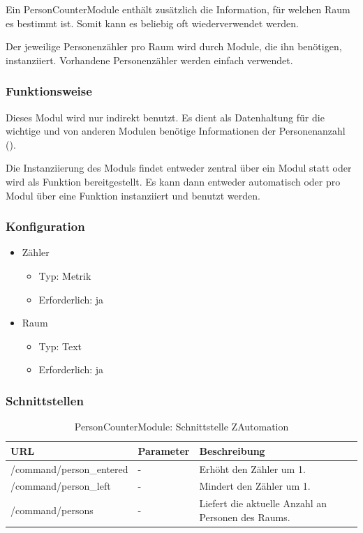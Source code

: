 Ein PersonCounterModule enthält zusätzlich die Information, für welchen Raum es bestimmt ist. Somit kann es beliebig oft wiederverwendet werden.

Der jeweilige Personenzähler pro Raum wird durch Module, die ihn benötigen, instanziiert. Vorhandene Personenzähler werden einfach verwendet.

\subsubsection{Funktionsweise}
Dieses Modul wird nur indirekt benutzt. Es dient als Datenhaltung für die wichtige und von anderen Modulen benötige Informationen der Personenanzahl ().

Die Instanziierung des Moduls findet entweder zentral über ein Modul statt oder wird als Funktion bereitgestellt. Es kann dann entweder automatisch oder pro Modul über eine Funktion instanziiert und benutzt werden.

\subsubsection{Konfiguration}
\begin{itemize}
	\item Zähler
	\begin{itemize}
		\item Typ: Metrik
		\item Erforderlich: ja
	\end{itemize}
	\item Raum
	\begin{itemize}
		\item Typ: Text
		\item Erforderlich: ja
	\end{itemize}
\end{itemize}

\subsubsection{Schnittstellen}

\begin{table}[H]
	\begin{tabularx}{\textwidth}{
			>{\hsize=1.25\hsize}X %
			>{\hsize=0.5\hsize\centering}X %
			>{\hsize=1.25\hsize}X %
		}
		\hline
		\textbf{URL}						& \textbf{Parameter}	& \textbf{Beschreibung} \\
		\hline /command/person\_entered		& - 					& Erhöht den Zähler um 1. \\ 
		\hline /command/person\_left		& - 			 		& Mindert den Zähler um 1. \\
		\hline /command/persons				& - 					& Liefert die aktuelle Anzahl an Personen des Raums. \\
		\hline
	\end{tabularx}
	\caption{PersonCounterModule: Schnittstelle ZAutomation}
\end{table}

